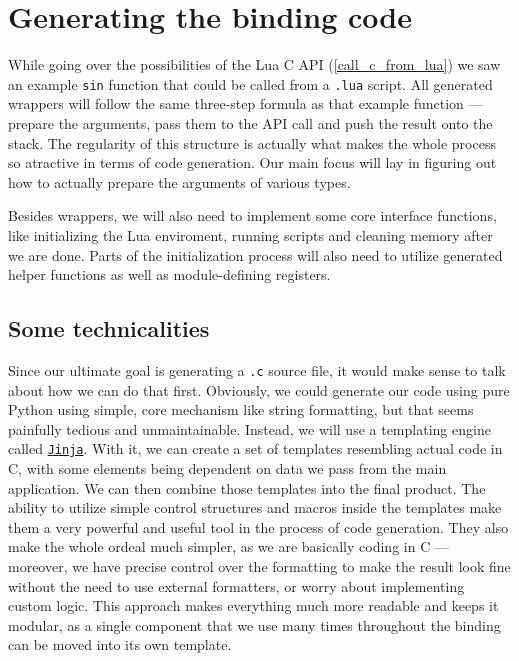 \documentclass[polish, english]{iithesis}
\begin{document}
\chapter{Generating the binding code}
  While going over the possibilities of the Lua C API (\ref{call_c_from_lua}) we saw an example \texttt{sin} function that could be called from a \texttt{.lua} script.
  All generated wrappers will follow the same three-step formula as that example function --- prepare the arguments, pass them to the API call and push the result onto the stack.
  The regularity of this structure is actually what makes the whole process so atractive in terms of code generation.
  Our main focus will lay in figuring out how to actually prepare the arguments of various types.

  Besides wrappers, we will also need to implement some core interface functions, like initializing the Lua enviroment, running scripts and cleaning memory after we are done.
  Parts of the initialization process will also need to utilize generated helper functions as well as module-defining registers.
  \section{Some technicalities}
    Since our ultimate goal is generating a \texttt{.c} source file, it would make sense to talk about how we can do that first.
    Obviously, we could generate our code using pure Python using simple, core mechanism like string formatting, but that seems painfully tedious and unmaintainable.
    Instead, we will use a templating engine called \href{https://jinja.palletsprojects.com/en/stable/}{\texttt{Jinja}}.
    With it, we can create a set of templates resembling actual code in C, with some elements being dependent on data we pass from the main application.
    We can then combine those templates into the final product.
    The ability to utilize simple control structures and macros inside the templates make them a very powerful and useful tool in the process of code generation.
    They also make the whole ordeal much simpler, as we are basically coding in C --- moreover, we have precise control over the formatting to make the result look fine without the need to use external formatters, or worry about implementing custom logic.
    This approach makes everything much more readable and keeps it modular, as a single component that we use many times throughout the binding can be moved into its own template.
\end{document}
